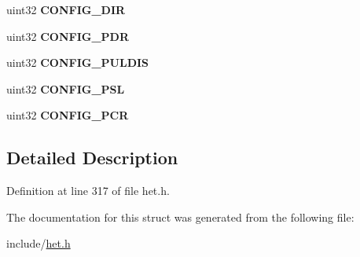 \begin{DoxyCompactItemize}
uint32 {\bfseries C\+O\+N\+F\+I\+G\+\_\+\+D\+IR}
\item 
\mbox{\label{structhet__config__reg_af17713e62f47abaa5f01941308bec414}} 
uint32 {\bfseries C\+O\+N\+F\+I\+G\+\_\+\+P\+DR}
\item 
\mbox{\label{structhet__config__reg_ab9e994c620812ddb07216e242d011f1e}} 
uint32 {\bfseries C\+O\+N\+F\+I\+G\+\_\+\+P\+U\+L\+D\+IS}
\item 
\mbox{\label{structhet__config__reg_a30bcb0193ba4352851dd1b2dd0e53cb7}} 
uint32 {\bfseries C\+O\+N\+F\+I\+G\+\_\+\+P\+SL}
\item 
\mbox{\label{structhet__config__reg_ad27c41fd8a649e4be7c9f92f87bad083}} 
uint32 {\bfseries C\+O\+N\+F\+I\+G\+\_\+\+P\+CR}
\end{DoxyCompactItemize}


\subsection{Detailed Description}


Definition at line 317 of file het.\+h.



The documentation for this struct was generated from the following file\+:\begin{DoxyCompactItemize}
\item 
include/\mbox{\hyperlink{het_8h}{het.\+h}}\end{DoxyCompactItemize}
